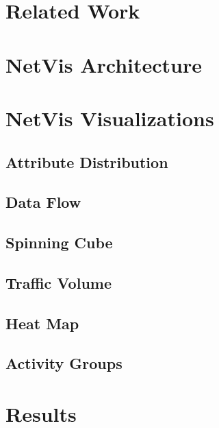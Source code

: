 \section{Related Work}


\section{NetVis Architecture}


\section{NetVis Visualizations}


\subsection{Attribute Distribution}


\subsection{Data Flow}


\subsection{Spinning Cube}


\subsection{Traffic Volume}


\subsection{Heat Map}


\subsection{Activity Groups}


\section{Results}


